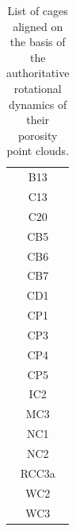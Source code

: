 \documentclass[journal=jacsat,manuscript=article]{achemso}
\begin{document}
\begin{table}[h!]
  \caption{List of cages aligned on the basis of the authoritative rotational dynamics of their porosity point clouds.}
  \label{tbl:aligned_via_rotational_dynamics}
  \centering
  \begin{tabular}{c}
    \toprule
B13 \\
C13 \\
C20 \\
CB5 \\
CB6 \\
CB7 \\
CD1 \\
CP1 \\
CP3 \\
CP4 \\
CP5 \\
IC2 \\
MC3 \\
NC1 \\
NC2 \\
RCC3a \\
WC2 \\
WC3 \\
    \bottomrule
  \end{tabular}
\end{table}
\end{document}

